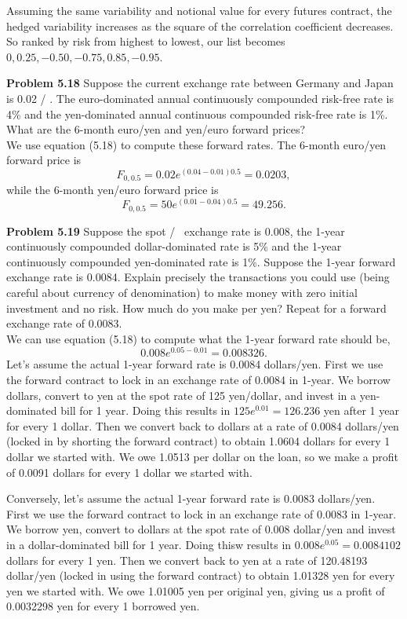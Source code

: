 \documentclass[12pt]{article}
\newcommand{\problem}[1]{\bigskip \noindent \textbf{Problem #1}}
\theoremstyle{plain}
\begin{document}
Assuming the same variability and notional value for every futures contract, the hedged variability increases as the square of the correlation coefficient decreases. So ranked by risk from highest to lowest, our list becomes $0,0.25, -0.50,-0.75,0.85,-0.95$.

\problem{5.18} Suppose the current exchange rate between Germany and Japan is 0.02 \texteuro / \textyen. The euro-dominated annual continuously compounded risk-free rate is 4\% and the yen-dominated annual continuous compounded risk-free rate is 1\%. What are the 6-month euro/yen and yen/euro forward prices?\\

We use equation (5.18) to compute these forward rates. The 6-month euro/yen forward price is
\[
F_{0,0.5} = 0.02e^{(0.04 - 0.01)0.5} = 0.0203,
\]
while the 6-month yen/euro forward price is
\[
F_{0,0.5} = 50e^{(0.01-0.04)0.5} = 49.256.
\]

\problem{5.19} Suppose the spot \textdollar / \textyen ~exchange rate is 0.008, the 1-year continuously compounded dollar-dominated rate is 5\% and the 1-year continuously compounded yen-dominated rate is 1\%. Suppose the 1-year forward exchange rate is 0.0084. Explain precisely the transactions you could use (being careful about currency of denomination) to make money with zero initial investment and no risk. How much do you make per yen? Repeat for a forward exchange rate of 0.0083.\\

We can use equation (5.18) to compute what the 1-year forward rate should be,
\[
0.008e^{0.05-0.01} = 0.008326.
\]
Let's assume the actual 1-year forward rate is 0.0084 dollars/yen. First we use the forward contract to lock in an exchange rate of 0.0084 in 1-year. We borrow dollars, convert to yen at the spot rate of 125 yen/dollar, and invest in a yen-dominated bill for 1 year. Doing this results in $125e^{0.01} = 126.236$ yen after 1 year for every 1 dollar. Then we convert back to dollars at a rate of 0.0084 dollars/yen (locked in by shorting the forward contract) to obtain 1.0604 dollars for every 1 dollar we started with. We owe 1.0513 per dollar on the loan, so we make a profit of 0.0091 dollars for every 1 dollar we started with.

Conversely, let's assume the actual 1-year forward rate is 0.0083 dollars/yen. First we use the forward contract to lock in an exchange rate of 0.0083 in 1-year. We borrow yen, convert to dollars at the spot rate of 0.008 dollar/yen and invest in a dollar-dominated bill for 1 year. Doing thisw results in $0.008e^{0.05} = 0.0084102$ dollars for every 1 yen. Then we convert back to yen at a rate of 120.48193 dollar/yen (locked in using the forward contract) to obtain 1.01328 yen for every yen we started with. We owe 1.01005 yen per original yen, giving us a profit of 0.0032298 yen for every 1 borrowed yen.
\end{document}
